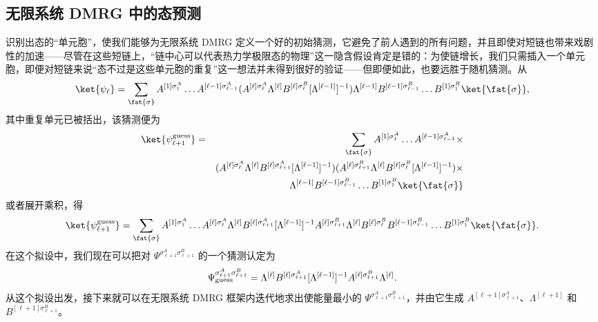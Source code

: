 \subsection{无限系统 DMRG 中的态预测} 
识别出态的``单元胞''，使我们能够为无限系统 DMRG 定义一个好的初始猜测\cite{McCulloch08}，它避免了前人遇到的所有问题，并且即使对短链也带来戏剧性的加速——尽管在这些短链上，``链中心可以代表热力学极限态的物理''这一隐含假设肯定是错的：为使链增长，我们只需插入一个单元胞，即便对短链来说``态不过是这些单元胞的重复''这一想法并未得到很好的验证——但即便如此，也要远胜于随机猜测。从
\begin{equation}
\ket{\psi_{\ell}} =  \sum_{\fat{\sigma}} A^{[1]\sigma_1^A} \ldots A^{[\ell-1]\sigma_{\ell-1}^A} (A^{[\ell]\sigma_\ell^A} \Lambda^{[\ell]} B^{[\ell]\sigma_\ell^B} [\Lambda^{[\ell-1]}]^{-1}) \Lambda^{[\ell-1]} B^{[\ell-1]\sigma_{\ell-1}^B} \ldots B^{[1]\sigma_1^B} \ket{\fat{\sigma}},
\end{equation} 
其中重复单元已被括出，该猜测便为
\begin{eqnarray}
\ket{\psi_{\ell+1}^{{\rm guess}}} &=& \sum_{\fat{\sigma}} A^{[1]\sigma_1^A} \ldots  A^{[\ell-1]\sigma_{\ell-1}^A} \times \nonumber \\
& & ( A^{[\ell]\sigma_\ell^A} \Lambda^{[\ell]} B^{[\ell]\sigma_{\ell+1}^A} [\Lambda^{[\ell-1]}]^{-1} ) (A^{[\ell]\sigma_{\ell+1}^B} \Lambda^{[\ell]} B^{[\ell]\sigma_\ell^B}  
[\Lambda^{[\ell-1]}]^{-1} ) \times \nonumber \\
& &  \Lambda^{[\ell-1]} B^{[\ell-1]\sigma_{\ell-1}^B} \ldots B^{[1]\sigma_1^B} \ket{\fat{\sigma}} 
\end{eqnarray}
或者展开乘积，得 
\begin{equation}
\ket{\psi_{\ell+1}^{{\rm guess}}} = \sum_{\fat{\sigma}} A^{[1]\sigma_1^A} \ldots A^{[\ell]\sigma_\ell^A} \Lambda^{[\ell]} B^{[\ell]\sigma_{\ell+1}^A} [\Lambda^{[\ell-1]}]^{-1} A^{[\ell]\sigma_{\ell+1}^B} \Lambda^{[\ell]} B^{[\ell]\sigma_\ell^B} B^{[\ell-1]\sigma_{\ell-1}^B} \ldots B^{[1]\sigma_1^B} \ket{\fat{\sigma}} .
\end{equation}
在这个拟设中，我们现在可以把对 $\Psi^{\sigma_{\ell+1}^A\sigma_{\ell+1}^B}$ 的一个猜测认定为
\begin{equation}
\Psi^{\sigma_{\ell+1}^A\sigma_{\ell+1}^B}_{{\rm guess}} =
\Lambda^{[\ell]} B^{[\ell]\sigma_{\ell+1}^A} [\Lambda^{[\ell-1]}]^{-1} A^{[\ell]\sigma_{\ell+1}^B} \Lambda^{[\ell]} .
\label{eq:guess2sites}
\end{equation}
从这个拟设出发，接下来就可以在无限系统 DMRG 框架内迭代地求出使能量最小的 $\Psi^{\sigma_{\ell+1}^A\sigma_{\ell+1}^B}$，并由它生成 $A^{[\ell+1]\sigma_{\ell+1}^A}$、$\Lambda^{[\ell+1]}$ 和 $B^{[\ell+1]\sigma_{\ell+1}^B}$。

